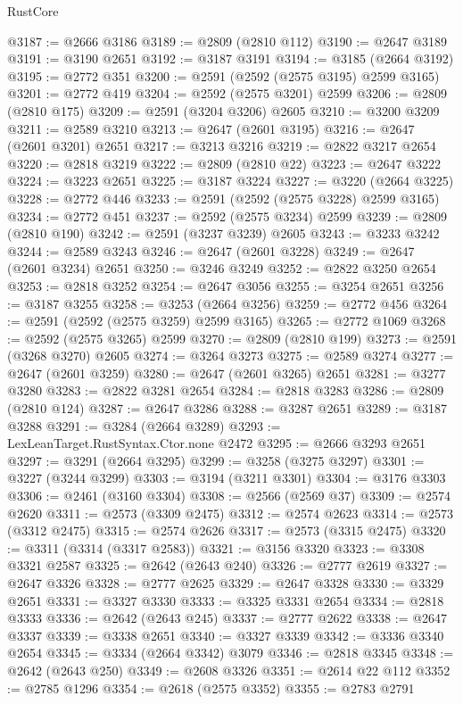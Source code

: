 \begin{lexlean}{RustCore}
\begin{coremodule}
@3187 := @2666 @3186
@3189 := @2809 (@2810 @112)
@3190 := @2647 @3189
@3191 := @3190 @2651
@3192 := @3187 @3191
@3194 := @3185 (@2664 @3192)
@3195 := @2772 @351
@3200 := @2591 (@2592 (@2575 @3195) @2599 @3165)
@3201 := @2772 @419
@3204 := @2592 (@2575 @3201) @2599
@3206 := @2809 (@2810 @175)
@3209 := @2591 (@3204 @3206) @2605
@3210 := @3200 @3209
@3211 := @2589 @3210
@3213 := @2647 (@2601 @3195)
@3216 := @2647 (@2601 @3201) @2651
@3217 := @3213 @3216
@3219 := @2822 @3217 @2654
@3220 := @2818 @3219
@3222 := @2809 (@2810 @22)
@3223 := @2647 @3222
@3224 := @3223 @2651
@3225 := @3187 @3224
@3227 := @3220 (@2664 @3225)
@3228 := @2772 @446
@3233 := @2591 (@2592 (@2575 @3228) @2599 @3165)
@3234 := @2772 @451
@3237 := @2592 (@2575 @3234) @2599
@3239 := @2809 (@2810 @190)
@3242 := @2591 (@3237 @3239) @2605
@3243 := @3233 @3242
@3244 := @2589 @3243
@3246 := @2647 (@2601 @3228)
@3249 := @2647 (@2601 @3234) @2651
@3250 := @3246 @3249
@3252 := @2822 @3250 @2654
@3253 := @2818 @3252
@3254 := @2647 @3056
@3255 := @3254 @2651
@3256 := @3187 @3255
@3258 := @3253 (@2664 @3256)
@3259 := @2772 @456
@3264 := @2591 (@2592 (@2575 @3259) @2599 @3165)
@3265 := @2772 @1069
@3268 := @2592 (@2575 @3265) @2599
@3270 := @2809 (@2810 @199)
@3273 := @2591 (@3268 @3270) @2605
@3274 := @3264 @3273
@3275 := @2589 @3274
@3277 := @2647 (@2601 @3259)
@3280 := @2647 (@2601 @3265) @2651
@3281 := @3277 @3280
@3283 := @2822 @3281 @2654
@3284 := @2818 @3283
@3286 := @2809 (@2810 @124)
@3287 := @2647 @3286
@3288 := @3287 @2651
@3289 := @3187 @3288
@3291 := @3284 (@2664 @3289)
@3293 := LexLeanTarget.RustSyntax.Ctor.none @2472
@3295 := @2666 @3293 @2651
@3297 := @3291 (@2664 @3295)
@3299 := @3258 (@3275 @3297)
@3301 := @3227 (@3244 @3299)
@3303 := @3194 (@3211 @3301)
@3304 := @3176 @3303
@3306 := @2461 (@3160 @3304)
@3308 := @2566 (@2569 @37)
@3309 := @2574 @2620
@3311 := @2573 (@3309 @2475)
@3312 := @2574 @2623
@3314 := @2573 (@3312 @2475)
@3315 := @2574 @2626
@3317 := @2573 (@3315 @2475)
@3320 := @3311 (@3314 (@3317 @2583))
@3321 := @3156 @3320
@3323 := @3308 @3321 @2587
@3325 := @2642 (@2643 @240)
@3326 := @2777 @2619
@3327 := @2647 @3326
@3328 := @2777 @2625
@3329 := @2647 @3328
@3330 := @3329 @2651
@3331 := @3327 @3330
@3333 := @3325 @3331 @2654
@3334 := @2818 @3333
@3336 := @2642 (@2643 @245)
@3337 := @2777 @2622
@3338 := @2647 @3337
@3339 := @3338 @2651
@3340 := @3327 @3339
@3342 := @3336 @3340 @2654
@3345 := @3334 (@2664 @3342) @3079
@3346 := @2818 @3345
@3348 := @2642 (@2643 @250)
@3349 := @2608 @3326
@3351 := @2614 @22 @112
@3352 := @2785 @1296
@3354 := @2618 (@2575 @3352)
@3355 := @2783 @2791

\end{coremodule}
\end{lexlean}
